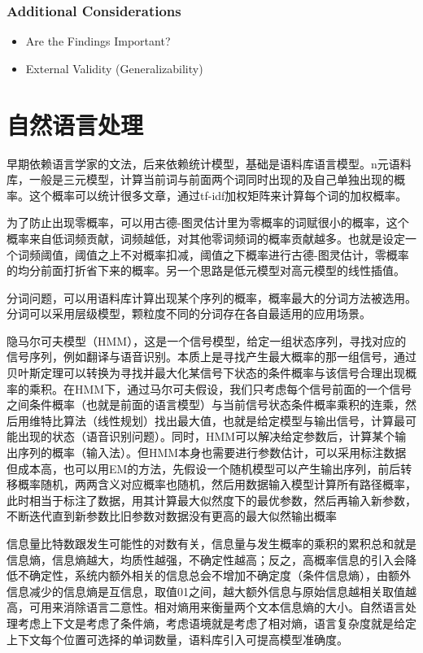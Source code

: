\documentclass[
]{book}
\providecommand{\tightlist}{%
  \setlength{\itemsep}{0pt}\setlength{\parskip}{0pt}}
\begin{document}
\hypertarget{additional-considerations}{%
\subsection{Additional Considerations}\label{additional-considerations}}

\begin{itemize}
\tightlist
\item
  Are the Findings Important?
\item
  External Validity (Generalizability)
\end{itemize}

\hypertarget{nlp}{%
\chapter{自然语言处理}\label{nlp}}

早期依赖语言学家的文法，后来依赖统计模型，基础是语料库语言模型。n元语料库，一般是三元模型，计算当前词与前面两个词同时出现的及自己单独出现的概率。这个概率可以统计很多文章，通过tf-idf加权矩阵来计算每个词的加权概率。

为了防止出现零概率，可以用古德-图灵估计里为零概率的词赋很小的概率，这个概率来自低词频贡献，词频越低，对其他零词频词的概率贡献越多。也就是设定一个词频阈值，阈值之上不对概率扣减，阈值之下概率进行古德-图灵估计，零概率的均分前面打折省下来的概率。另一个思路是低元模型对高元模型的线性插值。

分词问题，可以用语料库计算出现某个序列的概率，概率最大的分词方法被选用。分词可以采用层级模型，颗粒度不同的分词存在各自最适用的应用场景。

隐马尔可夫模型（HMM），这是一个信号模型，给定一组状态序列，寻找对应的信号序列，例如翻译与语音识别。本质上是寻找产生最大概率的那一组信号，通过贝叶斯定理可以转换为寻找并最大化某信号下状态的条件概率与该信号合理出现概率的乘积。在HMM下，通过马尔可夫假设，我们只考虑每个信号前面的一个信号之间条件概率（也就是前面的语言模型）与当前信号状态条件概率乘积的连乘，然后用维特比算法（线性规划）找出最大值，也就是给定模型与输出信号，计算最可能出现的状态（语音识别问题）。同时，HMM可以解决给定参数后，计算某个输出序列的概率（输入法）。但HMM本身也需要进行参数估计，可以采用标注数据但成本高，也可以用EM的方法，先假设一个随机模型可以产生输出序列，前后转移概率随机，两两含义对应概率也随机，然后用数据输入模型计算所有路径概率，此时相当于标注了数据，用其计算最大似然度下的最优参数，然后再输入新参数，不断迭代直到新参数比旧参数对数据没有更高的最大似然输出概率

信息量比特数跟发生可能性的对数有关，信息量与发生概率的乘积的累积总和就是信息熵，信息熵越大，均质性越强，不确定性越高；反之，高概率信息的引入会降低不确定性，系统内额外相关的信息总会不增加不确定度（条件信息熵），由额外信息减少的信息熵是互信息，取值01之间，越大额外信息与原始信息越相关取值越高，可用来消除语言二意性。相对熵用来衡量两个文本信息熵的大小。自然语言处理考虑上下文是考虑了条件熵，考虑语境就是考虑了相对熵，语言复杂度就是给定上下文每个位置可选择的单词数量，语料库引入可提高模型准确度。
\end{document}
